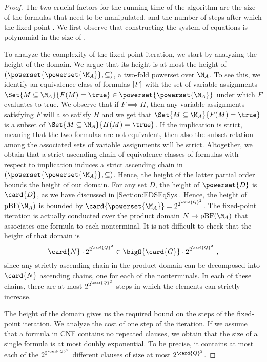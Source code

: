 \documentclass[../../diss.tex]{subfiles}
\begin{document}
\begin{proof}
    The two crucial factors for the running time of the algorithm are the size of the formulas that need to be manipulated, and the number of steps after which the fixed point .
%
    We first observe that constructing the system of equations is polynomial in the size of .

    To analyze the complexity of the fixed-point iteration, we start by analyzing the height of the domain.
    We argue that its height is at most the height of $(\powerset{\powerset{\nfatransmonoid{A}}}, \subseteq)$, a two-fold powerset over $\nfatransmonoid{A}$.
    To see this, we identify an equivalence class of formulas $[F]$ with the set of variable assignments $\Set{ M \subseteq \nfatransmonoid{A}}{ F(M) = \true  } \in \powerset{\powerset{\nfatransmonoid{A}}}$ under which $F$ evaluates to true.
    We observe that if $F \implies H$, then any variable assignments satisfying $F$ will also satisfy $H$ and we get that $\Set{ M \subseteq \nfatransmonoid{A}}{ F(M) = \true  }$ is a subset of $\Set{ M \subseteq \nfatransmonoid{A}}{ H(M) = \true  }$.
    If the implication is strict, meaning that the two formulas are not equivalent, then also the subset relation among the associated sets of variable assignments will be strict.
    Altogether, we obtain that a strict ascending chain of equivalence classes of formulas with respect to implication induces a strict ascending chain in $(\powerset{\powerset{\nfatransmonoid{A}}}, \subseteq)$.
    Hence, the height of the latter partial order bounds the height of our domain.
    For any set $D$, the height of $\powerset{D}$ is $\card{D}$, as we have discussed in \cref{Section:EDSEqSys}.
    Hence, the height of $\pBF(\nfatransmonoid{A})$ is bounded by $\card{\powerset{\nfatransmonoid{A}}} = 2^{2^{\card{Q}^2}}$.
    The fixed-point iteration is actually conducted over the product domain $N \to \pBF(\nfatransmonoid{A})$ that associates one formula to each nonterminal.
    It is not difficult to check that the height of that domain is
    \[
        \card{N} \cdot 2^{2^{\card{Q}^2}} \in \bigO{\card{G}} \cdot 2^{2^{\card{Q}^2}}
        \ ,
    \]
    since any strictly ascending chain in the product domain can be decomposed into $\card{N}$ ascending chains, one for each of the nonterminals.
    In each of these chains, there are at most $2^{2^{\card{Q}^2}}$ steps in which the elements can strictly increase.

    The height of the domain gives us the required bound on the steps of the fixed-point iteration.
    We analyze the cost of one step of the iteration.
    If we assume that a formula in CNF contains no repeated clauses, we obtain that the size of a single formula is at most doubly exponential.
    To be precise, it contains at most each of the $2^{2^{\card{Q}^2}}$ different clauses of size at most $2^{\card{Q}^2}$.


\end{proof}
\end{document}
